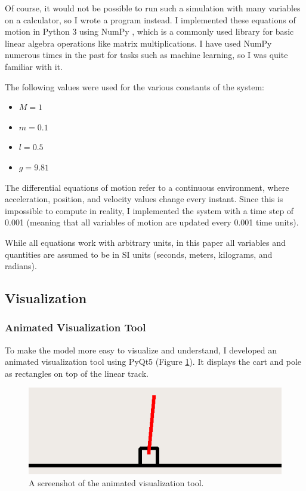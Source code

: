 \documentclass[12pt]{article}
\begin{document}
Of course, it would not be possible to run such a simulation with many variables on a calculator, so I wrote a program instead. I implemented these equations of motion in Python 3 using NumPy \cite{numpy}, which is a commonly used library for basic linear algebra operations like matrix multiplications. I have used NumPy numerous times in the past for tasks such as machine learning, so I was quite familiar with it.

The following values were used for the various constants of the system:

\begin{itemize}
    \item $M = 1$
    \item $m = 0.1$
    \item $l = 0.5$
    \item $g = 9.81$
\end{itemize}

The differential equations of motion refer to a continuous environment, where acceleration, position, and velocity values change every instant. Since this is impossible to compute in reality, I implemented the system with a time step of 0.001 (meaning that all variables of motion are updated every 0.001 time units).

While all equations work with arbitrary units, in this paper all variables and quantities are assumed to be in SI units (seconds, meters, kilograms, and radians).

\subsection{Visualization}

\subsubsection{Animated Visualization Tool}

To make the model more easy to visualize and understand, I developed an animated visualization tool using PyQt5 (Figure \ref{simulation}). It displays the cart and pole as rectangles on top of the linear track.

\begin{figure}[ht]
    \centering
    \includegraphics[width=\textwidth]{simulation}
    \caption{\label{simulation} A screenshot of the animated visualization tool.}
\end{figure}
\end{document}
